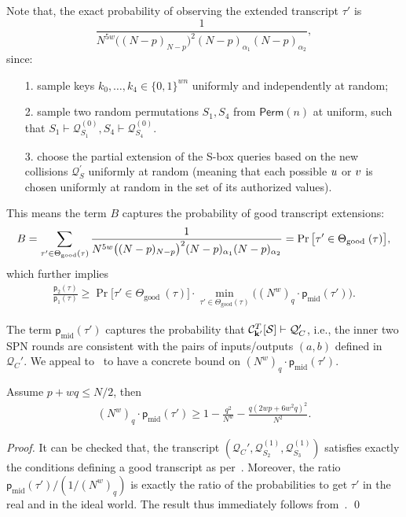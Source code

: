 Note that, the exact probability of observing the extended transcript $\tau'$ is
%
%
$$\frac{1}{N^{5w}\big((N-p)_{N-p}\big)^2(N-p)_{\alpha_1}(N-p)_{\alpha_2}},$$
%
since:
%
\begin{itemize}
	\item[1.] sample keys $k_0,\ldots,k_4\in\{0,1\}^{wn}$ uniformly and independently at random;
	\item[2.] sample two random permutations $S_1,S_4$ from $\mathsf{Perm}(n)$ at uniform, such that $S_1\vdash\mathcal{Q}_{S_1}^{(0)},S_4\vdash\mathcal{Q}_{S_4}^{(0)}$.
	\item[3.] choose the partial extension of the S-box queries based on the new collisions $\mathcal{Q}_{S}^{\prime}$ uniformly at random (meaning that each possible $\mathnormal{u}$ or $\mathnormal{v}$ is chosen uniformly at random in the set of its authorized values).
\end{itemize}
%
%
This means the term $B$ captures the probability of good transcript extensions:
%
%
\begin{align}
B=\sum_{\tau^{\prime} \in \Theta_{\mathrm{good}}(\tau)}
	\frac{1}{N^{5w}\big((N-p)_{N-p}\big)^2(N-p)_{\alpha_1}(N-p)_{\alpha_2}}=\operatorname{Pr}\big[ \tau' \in \Theta_{\text {good }}(\tau)\big],   \notag
\end{align}
%
%
which further implies
%
%
\begin{align}
\frac{\mathsf{p}_{2}(\tau)}{\mathsf{p}_{1}(\tau)}   \geq  \Pr\big[ \tau' \in \Theta_{\text {good }}(\tau)\big]\cdot
  \min_{\tau' \in \Theta_{\mathrm{good}}(\tau)}\big((N^w)_q\cdot\mathsf{p}_{\mathrm{mid}}(\tau')\big). 
\label{eq:ratio-divide-4-rounds}
\end{align}
%
%


The term $\mathsf{p}_{\mathrm{mid}}(\tau')$ captures the probability that $\mathcal{C}_{\mathbf{k}'}^T[\mathcal{S}] \vdash \mathcal{Q}_C'$, i.e., the inner two SPN rounds are consistent with the pairs of inputs/outputs $(a,b)$ defined in $\mathcal{Q}_C'$. We appeal to~\cite{C:CDKLST18} to have a concrete bound on $(N^w)_q\cdot\mathsf{p}_{\mathrm{mid}}(\tau')$.

\begin{lemma}
	\label{lemma:bound-middle-two-rounds}
	
	Assume $p+wq\leq N/2$, then
	\begin{align}
	(N^w)_q\cdot\mathsf{p}_{\mathrm{mid}}(\tau') \geq 1-\frac{q^2}{N^w}-\frac{q(2wp+6w^2q)^2}{N^2}.
	\label{eq:bound-on-epsilon-mid}
	\end{align}
\end{lemma}
\begin{proof}
It can be checked that, the transcript $(\mathcal{Q}_C',\mathcal{Q}_{S_2}^{(1)},\mathcal{Q}_{S_3}^{(1)})$ satisfies exactly the conditions defining a good transcript as per~\cite[page 740]{C:CDKLST18}. Moreover,
the ratio $\mathsf{p}_{\mathrm{mid}}(\tau')/(1/(N^w)_q)$ is exactly the ratio of the probabilities to get $\tau'$ in the real and in the ideal world. The result thus immediately follows from~\cite[Lemma 9]{C:CDKLST18}.       \qed
\end{proof}



